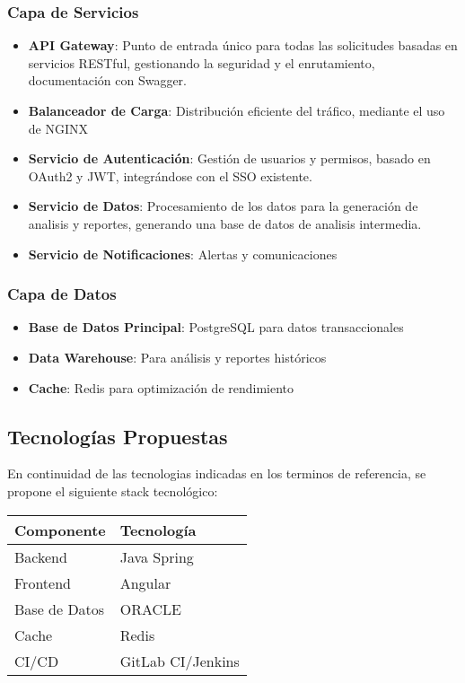 \subsubsection{Capa de Servicios}
\begin{itemize}
    \item \textbf{API Gateway}: Punto de entrada único para todas las solicitudes basadas en servicios RESTful, gestionando la seguridad y el enrutamiento, documentación con Swagger.
    \item \textbf{Balanceador de Carga}: Distribución eficiente del tráfico, mediante el uso de NGINX
    \item \textbf{Servicio de Autenticación}: Gestión de usuarios y permisos, basado en OAuth2 y JWT, integrándose con el SSO existente.
    \item \textbf{Servicio de Datos}: Procesamiento de los datos para la generación de analisis y reportes, generando una base de datos de analisis intermedia.
    \item \textbf{Servicio de Notificaciones}: Alertas y comunicaciones
\end{itemize}

\subsubsection{Capa de Datos}
\begin{itemize}
    \item \textbf{Base de Datos Principal}: PostgreSQL para datos transaccionales
    \item \textbf{Data Warehouse}: Para análisis y reportes históricos
    \item \textbf{Cache}: Redis para optimización de rendimiento
\end{itemize}

\subsection{Tecnologías Propuestas}
En continuidad de las tecnologias indicadas en los terminos de referencia, se propone el siguiente stack tecnológico:

\begin{table}[h]
\centering
\begin{tabular}{|l|l|}
\hline
\textbf{Componente} & \textbf{Tecnología} \\
\hline
Backend & Java Spring \\
Frontend & Angular \\
Base de Datos & ORACLE \\
Cache & Redis \\
CI/CD & GitLab CI/Jenkins \\
\hline
\end{tabular}
\end{table}

